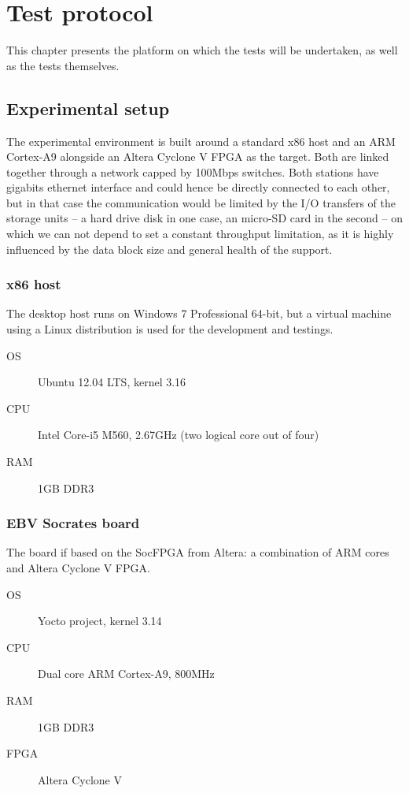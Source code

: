 \chapter{Test protocol}\label{chap:test-protocol}
This chapter presents the platform on which the tests will be undertaken, as well as the tests themselves.



\section{Experimental setup}
The experimental environment is built around a standard x86 host and an ARM Cortex-A9 alongside an Altera Cyclone V FPGA as the target.
Both are linked together through a network capped by 100Mbps switches.
Both stations have gigabits ethernet interface and could hence be directly connected to each other, but in that case the communication would be limited by the I/O transfers of the storage units -- a hard drive disk in one case, an micro-SD card in the second -- on which we can not depend to set a constant throughput limitation, as it is highly influenced by the data block size and general health of the support.


\subsection{x86 host}
The desktop host runs on Windows 7 Professional 64-bit, but a virtual machine using a Linux distribution is used for the development and testings.

\begin{framed}
\begin{description}
	\item[OS] Ubuntu 12.04 LTS, kernel 3.16
	\item[CPU] Intel Core-i5 M560, 2.67GHz (two logical core out of four)
	\item[RAM] 1GB DDR3
\end{description}
\end{framed}

\subsection{EBV Socrates board}
The board if based on the SocFPGA from Altera: a combination of ARM cores and Altera Cyclone V FPGA.

\begin{framed}
\begin{description}
	\item[OS] Yocto project, kernel 3.14
	\item[CPU] Dual core ARM Cortex-A9, 800MHz
	\item[RAM] 1GB DDR3
	\item[FPGA] Altera Cyclone V
\end{description}
\end{framed}

